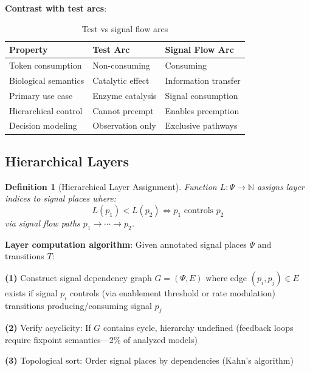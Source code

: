 \documentclass[twocolumn,11pt]{article}
\newtheorem{definition}{Definition}
\begin{document}
\vspace{3pt}
\noindent\textbf{Contrast with test arcs}:

\begin{table}[h]
\caption{Test vs signal flow arcs}
\centering
\small
\begin{tabular}{@{}p{}p{}p{}@{}}
\toprule
\textbf{Property} & \textbf{Test Arc} & \textbf{Signal Flow Arc} \\
\midrule
Token consumption & Non-consuming & Consuming \\
Biological semantics & Catalytic effect & Information transfer \\
Primary use case & Enzyme catalysis & Signal consumption \\
Hierarchical control & Cannot preempt & Enables preemption \\
Decision modeling & Observation only & Exclusive pathways \\
\bottomrule
\end{tabular}
\end{table}

\vspace{3pt}
\subsection{Hierarchical Layers}

\begin{definition}[Hierarchical Layer Assignment]
Function $L: \Psi \to \mathbb{N}$ assigns layer indices to signal places where:
\[
L(p_1) < L(p_2) \iff p_1 \text{ controls } p_2
\]
via signal flow paths $p_1 \to \cdots \to p_2$.
\end{definition}

\vspace{3pt}
\noindent\textbf{Layer computation algorithm}: Given annotated signal places $\Psi$ and transitions $T$:

\vspace{2pt}
\noindent\textbf{(1)} Construct signal dependency graph $G = (\Psi, E)$ where edge $(p_i, p_j) \in E$ exists if signal $p_i$ controls (via enablement threshold or rate modulation) transitions producing/consuming signal $p_j$

\vspace{2pt}
\noindent\textbf{(2)} Verify acyclicity: If $G$ contains cycle, hierarchy undefined (feedback loops require fixpoint semantics---2\% of analyzed models)

\vspace{2pt}
\noindent\textbf{(3)} Topological sort: Order signal places by dependencies (Kahn's algorithm)
\end{document}
